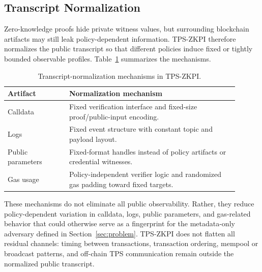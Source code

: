 \subsection{Transcript Normalization}

Zero-knowledge proofs hide private witness values, but surrounding
blockchain artifacts may still leak policy-dependent information. TPS-ZKPI therefore
normalizes the public transcript so that different policies induce fixed or tightly
bounded observable profiles. Table~\ref{tab:transcript-normalization}
summarizes the mechanisms.

\begin{table}[ht]
	\centering
	\caption{Transcript-normalization mechanisms in TPS-ZKPI.}
	\label{tab:transcript-normalization} \footnotesize
	\begin{tabular}{p{0.24\linewidth}p{0.66\linewidth}}
		\hline
		\textbf{Artifact} & \textbf{Normalization mechanism}                                                   \\
		\hline
		Calldata          & Fixed verification interface and fixed-size proof/public-input encoding.           \\
		Logs              & Fixed event structure with constant topic and payload layout.                      \\
		Public parameters & Fixed-format handles instead of policy artifacts or credential witnesses.          \\
		Gas usage         & Policy-independent verifier logic and randomized gas padding toward fixed targets. \\
		\hline
	\end{tabular}
\end{table}

These mechanisms do not eliminate all public observability. Rather, they reduce policy-dependent variation in calldata, logs, public parameters, and gas-related behavior that could otherwise serve as a fingerprint for the metadata-only adversary defined in Section~\ref{sec:problem}.
TPS-ZKPI does not flatten all residual channels: timing between transactions, transaction ordering, mempool or broadcast patterns, and off-chain TPS communication remain outside the normalized public transcript.
